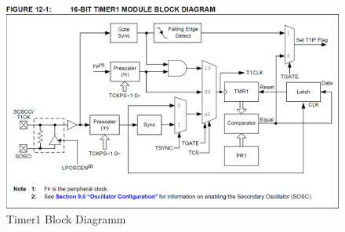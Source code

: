 \begin{figure}[h]
	\centering
	\includegraphics[width=\textwidth]{Images/timer1blockdiagramm}
	\caption[Timer1 Block Diagramm]{Timer1 Block Diagramm}
	\label{image:Timer1BlockDiagramm}
\end{figure}
